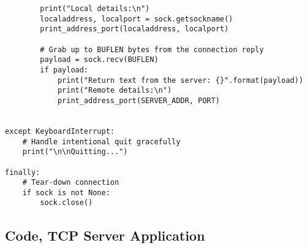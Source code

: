 \documentclass{article}
\begin{document}
\begin{verbatim}
        print("Local details:\n")
        localaddress, localport = sock.getsockname()
        print_address_port(localaddress, localport)

        # Grab up to BUFLEN bytes from the connection reply
        payload = sock.recv(BUFLEN)
        if payload:
            print("Return text from the server: {}".format(payload))
            print("Remote details:\n")
            print_address_port(SERVER_ADDR, PORT)
            

except KeyboardInterrupt:
    # Handle intentional quit gracefully
    print("\n\nQuitting...")

finally:
    # Tear-down connection
    if sock is not None:
        sock.close()
\end{verbatim}

\subsection*{Code, TCP Server Application}
\end{document}
